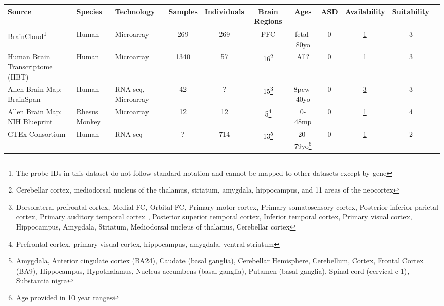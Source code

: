 \begin{sidewaystable}
\thispagestyle{empty}
\begin{center}
\begin{tabularx}{\linewidth}{ X l l c c c c c c c c }
Source & Species & Technology & Samples & Individuals & Brain Regions & Ages & ASD & Availability & Suitability \\
\hline

BrainCloud\footnote{The probe IDs in this dataset do not follow standard notation and cannot be mapped to other datasets except by gene} & Human & Microarray & 269 & 269 & PFC & fetal-80yo & 0 & \href{https://www.ncbi.nlm.nih.gov/geo/query/acc.cgi?acc=GSE30272}{1} & 3 \\

Human Brain Transcriptome (HBT) & Human & Microarray & 1340 & 57 & 16\footnote{Cerebellar cortex, mediodorsal nucleus of the thalamus, striatum, amygdala, hippocampus, and 11 areas of the neocortex\label{16brainregions}} & All? & 0 & \href{https://www.ncbi.nlm.nih.gov/geo/query/acc.cgi?acc=GSE25219}{1} & 3 \\

Allen Brain Map: BrainSpan & Human & RNA-seq, Microarray & 42 & ? & 15\footnote{Dorsolateral prefrontal cortex, Medial FC, Orbital FC, Primary motor cortex, Primary somatosensory cortex, Posterior inferior parietal cortex, Primary auditory temporal cortex , Posterior superior temporal cortex, Inferior temporal cortex, Primary visual cortex, Hippocampus, Amygdala, Striatum, Mediodorsal nucleus of thalamus, Cerebellar cortex} & 8pcw-40yo & 0 & \href{http://www.brainspan.org/static/download.html}{3} & 3 \\

Allen Brain Map: NIH Blueprint & Rhesus Monkey & Microarray & 12 & 12 & 5\footnote{Prefrontal cortex, primary visual cortex, hippocampus, amygdala, ventral striatum} & 0-48mp & 0 & \href{www.blueprintnhpatlas.org/macrodissection/well_data_files.xml}{1} & 4 \\

GTEx Consortium & Human & RNA-seq & ? & 714 & 13\footnote{Amygdala, Anterior cingulate cortex (BA24), Caudate (basal ganglia), Cerebellar Hemisphere, Cerebellum, Cortex, Frontal Cortex (BA9), Hippocampus, Hypothalamus, Nucleus accumbens (basal ganglia), Putamen (basal ganglia), Spinal cord (cervical c-1), Substantia nigra} & 20-79yo\footnote{Age provided in 10 year ranges} & 0 & \href{https://gtexportal.org/home/datasets}{1} & 2 \\


\end{tabularx}
\end{center}
\end{sidewaystable}
